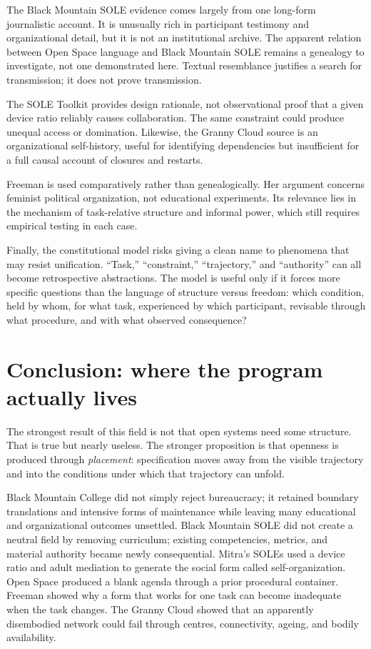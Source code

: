 \documentclass[11pt]{article}
\begin{document}
The Black Mountain SOLE evidence comes largely from one long-form journalistic account. It is unusually rich in participant testimony and organizational detail, but it is not an institutional archive. The apparent relation between Open Space language and Black Mountain SOLE remains a genealogy to investigate, not one demonstrated here. Textual resemblance justifies a search for transmission; it does not prove transmission.

The SOLE Toolkit provides design rationale, not observational proof that a given device ratio reliably causes collaboration. The same constraint could produce unequal access or domination. Likewise, the Granny Cloud source is an organizational self-history, useful for identifying dependencies but insufficient for a full causal account of closures and restarts.

Freeman is used comparatively rather than genealogically. Her argument concerns feminist political organization, not educational experiments. Its relevance lies in the mechanism of task-relative structure and informal power, which still requires empirical testing in each case.

Finally, the constitutional model risks giving a clean name to phenomena that may resist unification. ``Task,'' ``constraint,'' ``trajectory,'' and ``authority'' can all become retrospective abstractions. The model is useful only if it forces more specific questions than the language of structure versus freedom: which condition, held by whom, for what task, experienced by which participant, revisable through what procedure, and with what observed consequence?

\section{Conclusion: where the program actually lives}

The strongest result of this field is not that open systems need some structure. That is true but nearly useless. The stronger proposition is that openness is produced through \emph{placement}: specification moves away from the visible trajectory and into the conditions under which that trajectory can unfold.

Black Mountain College did not simply reject bureaucracy; it retained boundary translations and intensive forms of maintenance while leaving many educational and organizational outcomes unsettled. Black Mountain SOLE did not create a neutral field by removing curriculum; existing competencies, metrics, and material authority became newly consequential. Mitra's SOLEs used a device ratio and adult mediation to generate the social form called self-organization. Open Space produced a blank agenda through a prior procedural container. Freeman showed why a form that works for one task can become inadequate when the task changes. The Granny Cloud showed that an apparently disembodied network could fail through centres, connectivity, ageing, and bodily availability.
\end{document}
